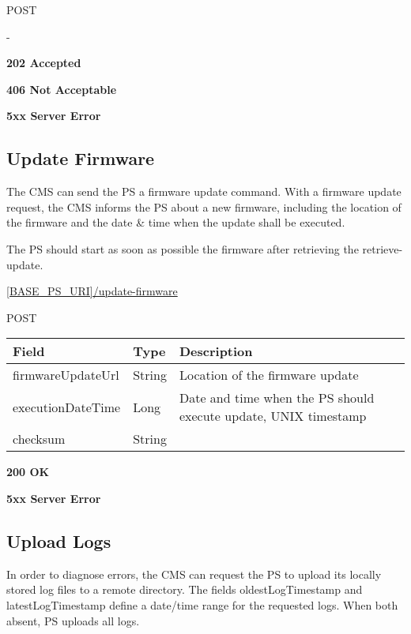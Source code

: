  POST

 -

 \textbf{202 Accepted}

 \textbf{406 Not Acceptable}

\textbf{5xx Server Error}

\subsection{Update Firmware}

The \acs{CMS} can send the \acs{PS} a firmware update command. With a firmware update request, the \acs{CMS} informs the \acs{PS} about a new firmware, including the location of the firmware and the date \& time when the update shall be executed.

The \acs{PS} should start as soon as possible the firmware after retrieving the retrieve-update.

 \url{[BASE_PS_URI]/update-firmware}

 POST

\begin{table}[!h]
\vspace{-7mm}
\begin{tabularx}{\linewidth}{ | l | l | X | }
  \hline
  \rowcolor{table-head}
  Field & Type & Description \\
  \hline
  firmwareUpdateUrl & String 		& Location of the firmware update \\
  executionDateTime	&  Long & Date and time when the \acs{PS} should execute update, UNIX timestamp \\
  checksum & String & \\
  \hline
\end{tabularx}
\end{table}

 \textbf{200 OK}

 \textbf{5xx Server Error}

\subsection{Upload Logs}

In order to diagnose errors, the \acs{CMS} can request the \acs{PS} to upload its locally stored log files to a remote directory. The fields oldestLogTimestamp and latestLogTimestamp define a date/time range for the requested logs. When both absent, \acs{PS} uploads all logs.

